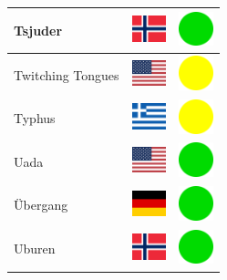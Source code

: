 \documentclass[12pt, a4paper, twoside]{report}
\begin{document}
\begin{center}
\begin{longtable}{|p{5cm}|p{2cm}|p{2cm}|}
 Tsjuder                                                    & \includegraphics[width=1cm]{../img/flags/no} &   \includegraphics[width=1cm]{../likes/y} \\ \hline
 Twitching Tongues                                          & \includegraphics[width=1cm]{../img/flags/us} &   \includegraphics[width=1cm]{../likes/m} \\ \hline
 Typhus                                                     & \includegraphics[width=1cm]{../img/flags/gr} &   \includegraphics[width=1cm]{../likes/m} \\ \hline
 Uada                                                       & \includegraphics[width=1cm]{../img/flags/us} &   \includegraphics[width=1cm]{../likes/y} \\ \hline
 Übergang                                                   & \includegraphics[width=1cm]{../img/flags/de} &   \includegraphics[width=1cm]{../likes/y} \\ \hline
 Uburen                                                     & \includegraphics[width=1cm]{../img/flags/no} &   \includegraphics[width=1cm]{../likes/y} \\ \hline

\end{longtable}
\end{center}
\end{document}
